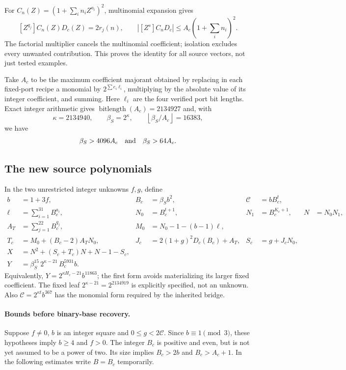 For $C_n(Z)=(1+\sum_i n_iZ^{a_i})^2$, multinomial expansion gives
\begin{equation}\label{eq:sel-extraction}
 [Z^{q_j}]C_n(Z)D_c(Z)=2r_j(n),\qquad
 \left|[Z^s]C_nD_c\right|\le A_c(1+\textstyle\sum_i n_i)^2.
\end{equation}
The factorial multiplier cancels the multinomial coefficient; isolation
excludes every unwanted contribution. This proves the identity for all
source vectors, not just tested examples.

Take $A_c$ to be the maximum coefficient majorant obtained by replacing
in each fixed-port recipe a monomial by $2^{\sum e_i\ell_i}$, multiplying
by the absolute value of its integer coefficient, and summing. Here
$\ell_i$ are the four verified port bit lengths. Exact integer arithmetic
gives $\operatorname{bitlength}(A_c)=2134927$ and, with
\[
 \kappa=2134940,\qquad \beta_S=2^\kappa,
 \qquad \left\lfloor\beta_S/A_c\right\rfloor=16383,
\]
we have
\begin{equation}\label{eq:sel-bound}
 \beta_S>4096A_c\quad\hbox{and}\quad\beta_S>64A_c.
\end{equation}

\subsection{The new source polynomials}

In the two unrestricted integer unknowns $f,g$, define
\begin{align*}
 b&=1+3f,& B_c&=\beta_S b^2,& \mathcal C&=bB_c^t,\\
 \ell&=\sum_{i=1}^{31}B_c^{a_i},&
 N_0&=B_c^{t+1},&N_1&=B_c^{K_c+1},&N&=N_0N_1,\\
 A_T&=\sum_{j=1}^{22}B_c^{q_j},&
 M_0&=N_0-1-(b-1)\ell,\\
 T_c&=M_0+(B_c-2)A_TN_0,&
 J_c&=2(1+g)^2D_c(B_c)+A_T,& S_c&=g+J_cN_0,\\
 X&=N^2+(S_c+T_c)N+N-1-S_c,\\
 Y&=\beta_S^{15}\,2^{\kappa-21}\,B_c^{5931}b.
\end{align*}
Equivalently, $Y=2^{\kappa H_c-21}b^{11863}$; the first form avoids
materializing its larger fixed coefficient. The fixed leaf
$2^{\kappa-21}=2^{2134919}$ is explicitly specified, not an unknown.
Also $\mathcal C=2^{\kappa t}b^{367}$ has the monomial form required
by the inherited bridge.

\paragraph{Bounds before binary-base recovery.}
Suppose $f\ne0$, $b$ is an integer square and $0\le g<2\mathcal C$.
Since $b\equiv1\pmod3$, these hypotheses imply $b\ge4$ and $f>0$.
The integer $B_c$ is positive and even, but is not yet assumed to be a
power of two. Its size implies $B_c>2b$ and $B_c>A_c+1$.
In the following estimates write $B=B_c$ temporarily.

